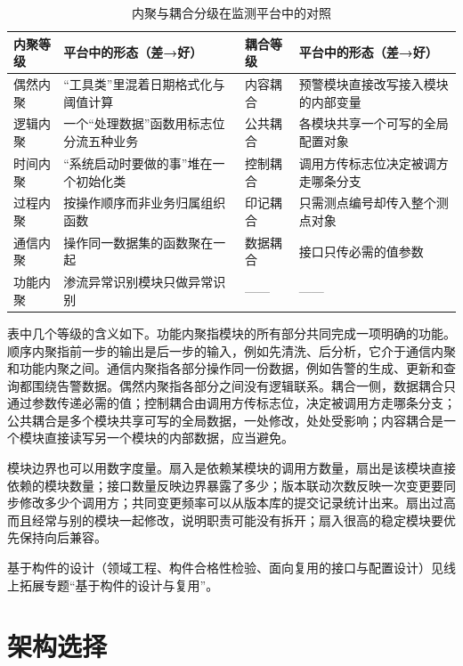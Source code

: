 \begin{table}[htbp]
\centering
\caption{内聚与耦合分级在监测平台中的对照}
\label{tab:ch03-cohesion-coupling}
\begin{tabular}{p{2.2cm}p{4.6cm}p{2.2cm}p{4.2cm}}
\toprule
内聚等级 & 平台中的形态（差→好） & 耦合等级 & 平台中的形态（差→好） \\
\midrule
偶然内聚 & “工具类”里混着日期格式化与阈值计算 & 内容耦合 & 预警模块直接改写接入模块的内部变量 \\
逻辑内聚 & 一个“处理数据”函数用标志位分流五种业务 & 公共耦合 & 各模块共享一个可写的全局配置对象 \\
时间内聚 & “系统启动时要做的事”堆在一个初始化类 & 控制耦合 & 调用方传标志位决定被调方走哪条分支 \\
过程内聚 & 按操作顺序而非业务归属组织函数 & 印记耦合 & 只需测点编号却传入整个测点对象 \\
通信内聚 & 操作同一数据集的函数聚在一起 & 数据耦合 & 接口只传必需的值参数 \\
功能内聚 & 渗流异常识别模块只做异常识别 & —— & —— \\
\bottomrule
\end{tabular}
\end{table}

表中几个等级的含义如下。功能内聚指模块的所有部分共同完成一项明确的功能。顺序内聚指前一步的输出是后一步的输入，例如先清洗、后分析，它介于通信内聚和功能内聚之间。通信内聚指各部分操作同一份数据，例如告警的生成、更新和查询都围绕告警数据。偶然内聚指各部分之间没有逻辑联系。耦合一侧，数据耦合只通过参数传递必需的值；控制耦合由调用方传标志位，决定被调用方走哪条分支；公共耦合是多个模块共享可写的全局数据，一处修改，处处受影响；内容耦合是一个模块直接读写另一个模块的内部数据，应当避免。

模块边界也可以用数字度量。扇入是依赖某模块的调用方数量，扇出是该模块直接依赖的模块数量；接口数量反映边界暴露了多少；版本联动次数反映一次变更要同步修改多少个调用方；共同变更频率可以从版本库的提交记录统计出来。扇出过高而且经常与别的模块一起修改，说明职责可能没有拆开；扇入很高的稳定模块要优先保持向后兼容。

基于构件的设计（领域工程、构件合格性检验、面向复用的接口与配置设计）见线上拓展专题“基于构件的设计与复用”。

\section{架构选择}\label{sec:ch03-selection}


